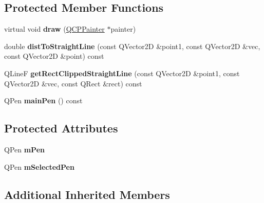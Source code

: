\subsection*{Protected Member Functions}
\begin{DoxyCompactItemize}
\item 
virtual void {\bfseries draw} (\hyperlink{classQCPPainter}{Q\+C\+P\+Painter} $\ast$painter)\hypertarget{classQCPItemStraightLine_a2daa1e1253216c26565d56a2d5530170}{}\label{classQCPItemStraightLine_a2daa1e1253216c26565d56a2d5530170}

\item 
double {\bfseries dist\+To\+Straight\+Line} (const Q\+Vector2D \&point1, const Q\+Vector2D \&vec, const Q\+Vector2D \&point) const \hypertarget{classQCPItemStraightLine_adc9b6c5bd33c7f806b748b79dfa25926}{}\label{classQCPItemStraightLine_adc9b6c5bd33c7f806b748b79dfa25926}

\item 
Q\+LineF {\bfseries get\+Rect\+Clipped\+Straight\+Line} (const Q\+Vector2D \&point1, const Q\+Vector2D \&vec, const Q\+Rect \&rect) const \hypertarget{classQCPItemStraightLine_af18ac29577b5b96fece15b0ffea70177}{}\label{classQCPItemStraightLine_af18ac29577b5b96fece15b0ffea70177}

\item 
Q\+Pen {\bfseries main\+Pen} () const \hypertarget{classQCPItemStraightLine_a63ef39814c5b560dbb7b13e3fec1d940}{}\label{classQCPItemStraightLine_a63ef39814c5b560dbb7b13e3fec1d940}

\end{DoxyCompactItemize}
\subsection*{Protected Attributes}
\begin{DoxyCompactItemize}
\item 
Q\+Pen {\bfseries m\+Pen}\hypertarget{classQCPItemStraightLine_a15106ddc2ebd73ed5c1bc57aa92bee8f}{}\label{classQCPItemStraightLine_a15106ddc2ebd73ed5c1bc57aa92bee8f}

\item 
Q\+Pen {\bfseries m\+Selected\+Pen}\hypertarget{classQCPItemStraightLine_a0307a0d56a018656adbf798bc84c2a4b}{}\label{classQCPItemStraightLine_a0307a0d56a018656adbf798bc84c2a4b}

\end{DoxyCompactItemize}
\subsection*{Additional Inherited Members}


